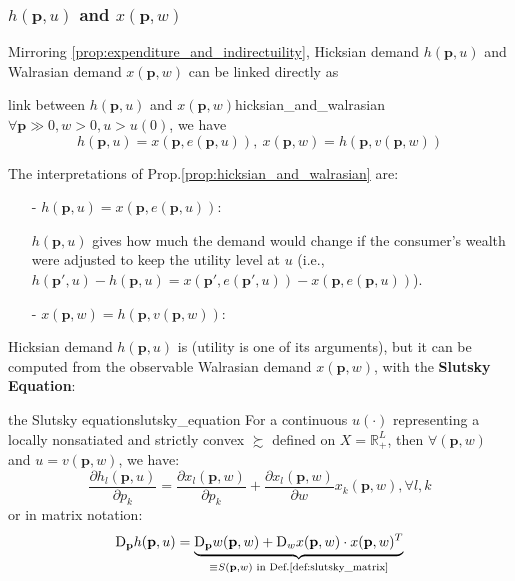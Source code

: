 \subsubsection*{$h(\mathbf{p},u)$ and $x(\mathbf{p},w)$}
Mirroring \ref{prop:expenditure_and_indirectuility}, Hicksian demand $h(\mathbf{p},u)$ and Walrasian demand $x(\mathbf{p},w)$ can be linked directly as
\begin{proposition}{link between $h(\mathbf{p},u)$ and $x(\mathbf{p},w)$}{hicksian_and_walrasian}
    $\forall \mathbf{p}\gg 0,w>0,u>u(0)$, we have $$h(\mathbf{p},u)=x(\mathbf{p},e(\mathbf{p},u)),\ x(\mathbf{p},w)=h(\mathbf{p},v(\mathbf{p},w))$$
\end{proposition}

The interpretations of Prop.\ref{prop:hicksian_and_walrasian} are:
\begin{enumerate}
    \item[-] $h(\mathbf{p},u)=x(\mathbf{p},e(\mathbf{p},u))$:
    
    $h(\mathbf{p},u)$ gives how much the demand would change if the consumer's wealth were adjusted to keep the utility level at $u$ (i.e., $h(\mathbf{p}',u)-h(\mathbf{p},u)=x(\mathbf{p}',e(\mathbf{p}',u))-x(\mathbf{p},e(\mathbf{p},u))$).
    \item[-] $x(\mathbf{p},w)=h(\mathbf{p},v(\mathbf{p},w))$:
\end{enumerate}

Hicksian demand $h(\mathbf{p},u)$ is  (utility is one of its arguments), but it can be computed from the observable Walrasian demand $x(\mathbf{p},w)$, with the \textbf{Slutsky Equation}:
\begin{theorem}{the Slutsky equation}{slutsky_equation}
    For a continuous $u(\cdot)$ representing a locally nonsatiated and strictly convex $\succsim$ defined on $X=\mathbb{R}^L_+$, then $\forall (\mathbf{p},w)$ and $u=v(\mathbf{p},w)$, we have:
    $$ \frac{\partial h_l(\mathbf{p},u)}{\partial p_k} = \frac{\partial x_l(\mathbf{p},w)}{\partial p_k} +\frac{\partial x_l(\mathbf{p},w)}{\partial w}x_k(\mathbf{p},w), \forall l,k $$
    or in matrix notation:
    $$ \mathrm{D}_{\mathbf{p}} h(\mathbf{p},u) = \underbrace{\mathrm{D}_{\mathbf{p}} w(\mathbf{p},w)+\mathrm{D}_w x(\mathbf{p},w)\cdot x(\mathbf{p},w)^T}_{\equiv S(\mathbf{p},w) \text{ in Def.\ref{def:slutsky_matrix}}}$$
\end{theorem}


